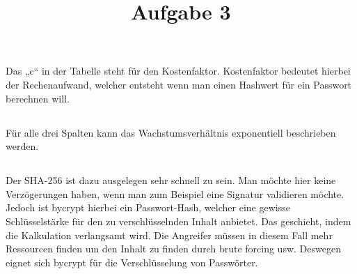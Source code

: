 \title{Aufgabe 3}

\subsection{}
Das „c“ in der Tabelle steht für den Kostenfaktor.
Kostenfaktor bedeutet hierbei der Rechenaufwand, welcher entsteht wenn man einen Hashwert für ein Passwort berechnen will. 

\subsection{}
Für alle drei Spalten kann das Wachstumsverhältnis exponentiell beschrieben werden. 

\subsection{}
Der SHA-256 ist dazu ausgelegen sehr schnell zu sein. Man möchte hier keine Verzögerungen haben, wenn man zum Beispiel eine Signatur validieren möchte.
Jedoch ist bycrypt hierbei ein Passwort-Hash, welcher eine gewisse Schlüsselstärke für den zu verschlüsselnden Inhalt anbietet. Das geschieht, indem die Kalkulation verlangsamt wird. Die Angreifer müssen in diesem Fall mehr Ressourcen finden um den Inhalt zu finden durch brute forcing usw. 
Deswegen eignet sich bycrypt für die Verschlüsselung von Passwörter.
